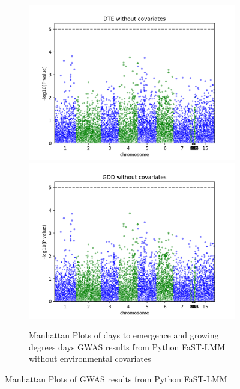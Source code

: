 \documentclass{article}
\begin{document}
\begin{figure}[!htb]
 \begin{subfigure}[normla]{\textwidth}
  \centering
	\includegraphics[scale=0.45]{FaST-LMM_DTE_ncov.png}
	\includegraphics[scale=0.45]{FaST-LMM_GDD_ncov.png}
	\caption{Manhattan Plots of days to emergence and growing degrees days GWAS results from Python FaST-LMM without environmental covariates}
  \label{fig:subfig2}
 \end{subfigure}

\caption{Manhattan Plots of GWAS results from Python FaST-LMM}
\label{fig:fastlmm_res}
\end{figure}
\end{document}
